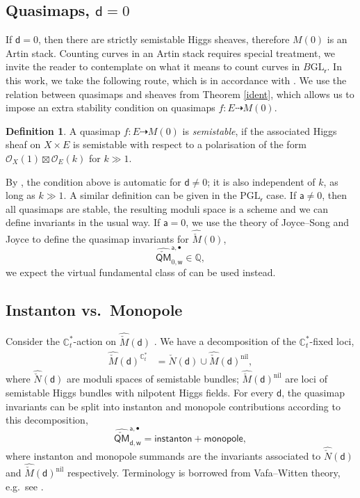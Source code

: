 \documentclass[11pt, reqno]{amsart}
\theoremstyle{plain}
\theoremstyle{definition}
\newtheorem{defn}[thm]{Definition}
\theoremstyle{remark}
\newcommand{\BC}{{\mathbb{C}}}
\newcommand{\BQ}{{\mathbb{Q}}}
\newcommand{\CO}{{\mathcal O}}
\newcommand{\wsf}{{\mathsf{w}}}
\newcommand{\rsf}{{\mathsf{r}}}
\newcommand{\dsf}{{\mathsf{d}}}
\newcommand{\asf}{{\mathsf{a}}}
\newcommand{\Msp}{\hat{\check{M}}}
\newcommand{\QMsp}{\hat{\check{\mathsf{QM}}}}
\newcommand{\Nsp}{\hat{\check{N}}}
\begin{document}
 \subsection{Quasimaps, $\dsf=0$} \label{d0} If $\dsf=0$, then there are strictly semistable Higgs sheaves, therefore $M(0)$ is an Artin stack. Counting curves in an Artin stack requires special treatment, we invite the reader to contemplate on what it means to count curves in $B\mathrm{GL}_\rsf$.  In this work, we take the following route, which is in accordance with \cite[Section 6]{Wit}. We use the relation between quasimaps and sheaves from Theorem \ref{ident}, which allows us to impose an extra stability condition on quasimaps  $f\colon E \dashrightarrow M(0)$. 
 
 \begin{defn}
 A quasimap $f\colon E \dashrightarrow M(0)$ is \textit{semistable}, if the associated Higgs sheaf on $X\times E$ is semistable with respect to a polarisation of the form $\CO_X(1)\boxtimes \CO_E(k)$ for $k\gg 1$. 

\end{defn}
By \cite[Proposition 5.4]{Nhiggs}, the condition above is automatic for $\dsf\neq 0$; it is also independent of $k$, as long as $k\gg 1$. A similar definition can be given in the $\mathrm{PGL}_\rsf$  case. If $\asf\neq 0$, then all quasimaps are stable, the resulting moduli space is a scheme and we can define invariants in the usual way. If $\asf=0$,  we use the theory of Joyce--Song \cite{JS} and Joyce \cite{J} to define the quasimap invariants for $\Msp(0)$, 
\[\QMsp^{\asf, \bullet}_{0,\wsf} \in \BQ,\] 
we expect the virtual fundamental class of \cite{ArP} can be used instead. 

\subsection{Instanton vs.\  Monopole}
Consider  the $\BC_t^*$-action on $\Msp(\dsf)$ . We have a decomposition of the $\BC_t^*$-fixed loci, 
\begin{align*}
	\Msp(\dsf)^{\BC_t^*}&=\Nsp(\dsf) \cup \Msp(\dsf)^{\mathrm{nil}}, 
\end{align*}
where $\Nsp(\dsf)$ are moduli spaces of semistable bundles;  $\Msp(\dsf)^{\mathrm{nil}}$ are loci of semistable Higgs bundles with nilpotent Higgs fields. For every $\dsf$, the quasimap invariants can be split into instanton and monopole contributions according to this decomposition, 
\[\QMsp^{\asf, \bullet}_{\dsf,\wsf}=  \textsf{instanton}+ \textsf{monopole}, \]
where \textsf{instanton} and  \textsf{monopole} summands are the invariants associated to $\Nsp(\dsf)$ and  $\Msp(\dsf)^{\mathrm{nil}}$ respectively. Terminology is borrowed from Vafa--Witten theory, e.g.\ see \cite{TT, TT2}. 
\end{document}
